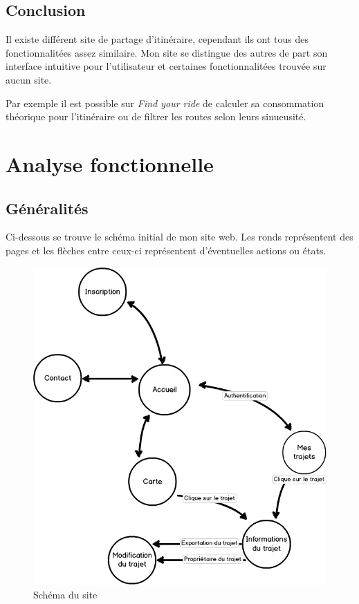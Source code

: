 \documentclass[a4paper]{article}
\newcommand{\fyr}{\emph{Find your ride }}
\begin{document}
\subsection{Conclusion}
Il existe différent site de partage d'itinéraire, cependant ils ont tous des fonctionnalitées assez similaire. Mon site se distingue des autres de part son interface intuitive pour l'utilisateur et certaines fonctionnalitées trouvée sur aucun site.

Par exemple il est possible sur \fyr de calculer sa consommation théorique pour l'itinéraire ou de filtrer les routes selon leurs sinueusité.



\pagebreak

\section{Analyse fonctionnelle}

\subsection{Généralités}
Ci-dessous se trouve le schéma initial de mon site web. Les ronds représentent des pages et les flèches entre ceux-ci représentent d'éventuelles actions ou états.

\begin{figure}[h]
\centering
\includegraphics[width=\textwidth]{./Images/ShemaSite.png}
\caption{Schéma du site}
\end{figure}
\end{document}
